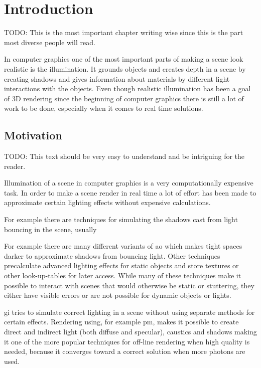 \chapter{Introduction}\label{cha:intro}

TODO: This is the most important chapter writing wise since this is the part most diverse people will read.

In computer graphics one of the most important parts of making a scene look realistic is the illumination. It grounds objects and creates depth in a scene by creating shadows and gives information about materials by different light interactions with the objects. 
Even though realistic illumination has been a goal of 3D rendering since the beginning of computer graphics there is still a lot of work to be done, especially when it comes to real time solutions.

\section{Motivation}

TODO: This text should be very easy to understand and be intriguing for the reader.

Illumination of a scene in computer graphics is a very computationally expensive task. 
In order to make a scene render in real time a lot of effort has been made to approximate certain lighting effects without expensive calculations.

For example there are techniques for simulating the shadows cast from light bouncing in the scene, usually 

For example there are many different variants of \gls{ao} which makes tight spaces darker to approximate shadows from bouncing light. 
Other techniques precalculate advanced lighting effects for static objects and store textures or other look-up-tables for later access. 
While many of these techniques make it possible to interact with scenes that would otherwise be static or stuttering, they either have visible errors or are not possible for dynamic objects or lights.

\gls{gi} tries to simulate correct lighting in a scene without using separate methods for certain effects. 
Rendering using, for example \gls{pm}, makes it possible to create direct and indirect light (both diffuse and specular), caustics and shadows making it one of the more popular techniques for off-line rendering when high quality is needed, because it converges toward a correct solution when more photons are used.

